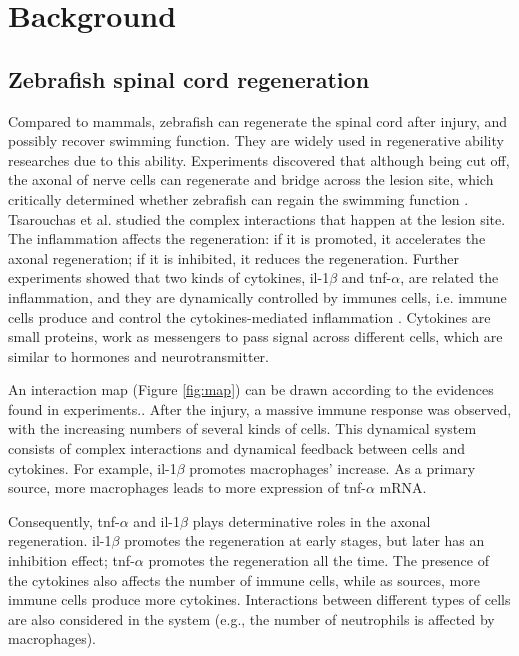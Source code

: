 \chapter{Background}

\section{Zebrafish spinal cord regeneration}


Compared to mammals, zebrafish can regenerate the spinal cord after injury, and possibly recover swimming function. They are widely used in regenerative ability researches due to this ability. Experiments discovered that although being cut off, the axonal of nerve cells can regenerate and bridge across the lesion site, which critically determined whether zebrafish can regain the swimming function \cite{axonal}. Tsarouchas et al. \cite{ref:Tsarouchas} studied the complex interactions that happen at the lesion site. The inflammation affects the regeneration: if it is promoted, it accelerates the axonal regeneration; if it is inhibited, it reduces the regeneration\cite{ref:Tsarouchas}. Further experiments showed that two kinds of cytokines, il-1$\beta$ and tnf-$\alpha$, are related the inflammation, and they are dynamically controlled by immunes cells, i.e. immune cells produce and control the cytokines-mediated inflammation \cite{ref:Tsarouchas}. Cytokines are small proteins, work as messengers to pass signal across different cells, which are similar to hormones and neurotransmitter.

An interaction map (Figure \ref{fig:map}) can be drawn according to the evidences found in experiments.\cite{ref:Tsarouchas}. After the injury, a massive immune response was observed, with the increasing numbers of several kinds of cells. This dynamical system consists of complex interactions and dynamical feedback between cells and cytokines. For example, il-1$\beta$ promotes macrophages' increase. As a primary source, more macrophages leads to more expression of tnf-$\alpha$ mRNA. 

Consequently, tnf-$\alpha$ and il-1$\beta$ plays determinative roles in the axonal regeneration. il-1$\beta$ promotes the regeneration at early stages, but later has an inhibition effect; tnf-$\alpha$ promotes the regeneration all the time. The presence of the cytokines also affects the number of immune cells, while as sources, more immune cells produce more cytokines. Interactions between different types of cells are also considered in the system (e.g., the number of neutrophils is affected by macrophages).

